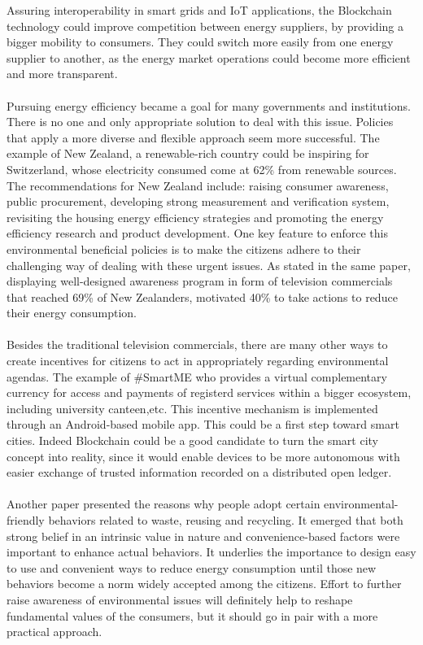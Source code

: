 \documentclass[11pt]{article}
\begin{document}
Assuring interoperability in smart grids and  IoT applications, the Blockchain technology could improve competition between energy suppliers, by providing a bigger mobility to consumers. They could switch more easily from one energy supplier to another, as the energy market operations could become more efficient and more transparent.\cite{20}\\\\
Pursuing energy efficiency became a goal for many governments and institutions. There is no one and only appropriate solution to deal with this issue. Policies that apply a more diverse and flexible approach seem more successful. The example of New Zealand, a renewable-rich country could be inspiring for Switzerland, whose electricity consumed come at 62\% from renewable sources\cite{10}. The recommendations for New Zealand include: raising consumer awareness, public procurement, developing strong measurement and verification system, revisiting the housing energy efficiency strategies and promoting the energy efficiency research and product development. One key feature to enforce this environmental beneficial policies is to make the citizens adhere to their challenging way of dealing with these urgent issues. As stated in the same paper, displaying well-designed awareness program in form of television commercials that reached 69\% of New Zealanders, motivated 40\% to take actions to reduce their energy consumption. \cite{11}\\\\
Besides the traditional television commercials, there are many other ways to create incentives for citizens to act in appropriately regarding environmental agendas. The example of \#SmartME who provides a virtual complementary currency for access and payments of registerd services within a bigger ecosystem, including university canteen,etc. This incentive mechanism is implemented through an Android-based mobile app. This could be a first step toward smart cities. Indeed Blockchain could be a good candidate to turn the smart city concept into reality, since it would enable devices to be more autonomous with easier exchange of trusted information recorded on a distributed open ledger.\cite{12}\\\\
Another paper presented the reasons why people adopt certain environmental-friendly behaviors related to waste, reusing and recycling. It emerged that both strong belief in an intrinsic value in nature and convenience-based factors were important to enhance actual behaviors. It underlies the importance to design easy to use and convenient ways to reduce energy consumption until those new behaviors become a norm widely accepted among the citizens. Effort to further raise awareness of environmental issues will definitely help to reshape fundamental values of the consumers, but it should go in pair with a more practical approach.\cite{13}\\\\
\end{document}
